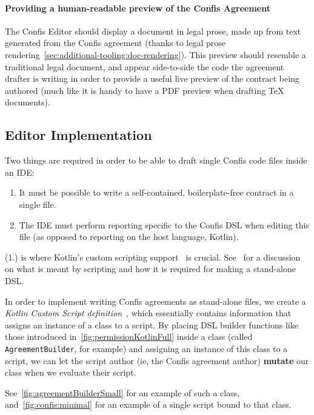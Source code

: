 \paragraph{Providing a human-readable preview of the Confis Agreement}

The Confis Editor should display a document in legal prose, made up from text generated from the Confis agreement (thanks to legal prose rendering~\ref{sec:additional-tooling:doc-rendering}).
This preview should resemble a traditional legal document, and appear side-to-side the code the agreement drafter is writing in order to provide a useful live preview of the contract being authored (much like it is handy to have a PDF preview when drafting TeX documents).

\subsection{Editor Implementation}\label{subsec:editor-implementation}

Two things are required in order to be able to draft single Confis code files inside an IDE:
\begin{enumerate}
    \item It must be possible to write a self-contained, boilerplate-free contract in a single file.
    \item The IDE must perform reporting specific to the Confis DSL when editing this file (as opposed to reporting on the host language, Kotlin).
\end{enumerate}

(1.) is where Kotlin's custom scripting support~\cite{kotlinScriptKeep} is crucial.
See~ for a discussion on what is meant by scripting and how it is required for making a stand-alone DSL.

In order to implement writing Confis agreements as stand-alone files, we create a \emph{Kotlin Custom Script definition}~\cite{kotlinScriptKeep}, which essentially contains information that assigns an instance of a class to a script.
By placing DSL builder functions like those introduced in~\autoref{fig:permissionKotlinFull} inside a class (called \texttt{AgreementBuilder}, for example) and assigning an instance of this class to a script, we can let the script author (ie, the Confis agreement author) \textbf{mutate} our class when we evaluate their script.

See~\autoref{fig:agreementBuilderSmall} for an example of such a class, and~\autoref{fig:confis:minimal} for an example of a single script bound to that class.

